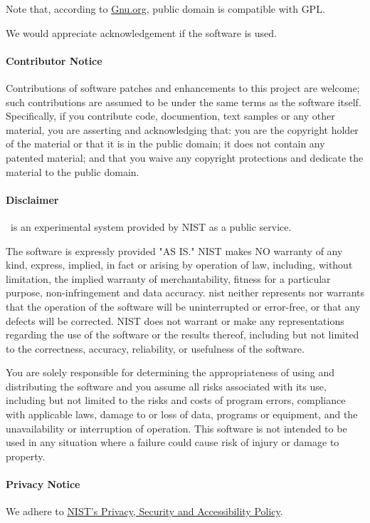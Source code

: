 \documentclass{article}
\begin{document}
Note that, according to
\href{http://www.gnu.org/licences/license-list.html#PublicDomain}{Gnu.org},
public domain is compatible with GPL.

We would appreciate acknowledgement if the software is used.

\paragraph{Contributor Notice}
  Contributions of software patches and enhancements to this project
are welcome; such contributions are assumed to be under the same terms
as the software itself.  Specifically, if you contribute code, documention,
text samples or any other material, you are asserting and acknowledging that:
you are the copyright holder of the material or that it is in the public domain;
it does not contain any patented material; and that you waive any copyright
protections and dedicate the material to the public domain.

\paragraph{Disclaimer}
  \LaTeXML\ is an experimental system provided by NIST as a public service.

The software is expressly provided "AS IS." NIST makes NO warranty of
any kind, express, implied, in fact or arising by operation of law,
including, without limitation, the implied warranty of
merchantability, fitness for a particular purpose, non-infringement
and data accuracy. nist neither represents nor warrants that the
operation of the software will be uninterrupted or error-free, or that
any defects will be corrected. NIST does not warrant or make any
representations regarding the use of the software or the results
thereof, including but not limited to the correctness, accuracy,
reliability, or usefulness of the software.

You are solely responsible for determining the appropriateness of
using and distributing the software and you assume all risks
associated with its use, including but not limited to the risks and
costs of program errors, compliance with applicable laws, damage to or
loss of data, programs or equipment, and the unavailability or
interruption of operation. This software is not intended to be used in
any situation where a failure could cause risk of injury or damage to
property.

\paragraph{Privacy Notice}
We adhere to \href{http://www.nist.gov/public_affairs/privacy.cfm}{NIST's Privacy, Security and Accessibility Policy}.
\end{document}
